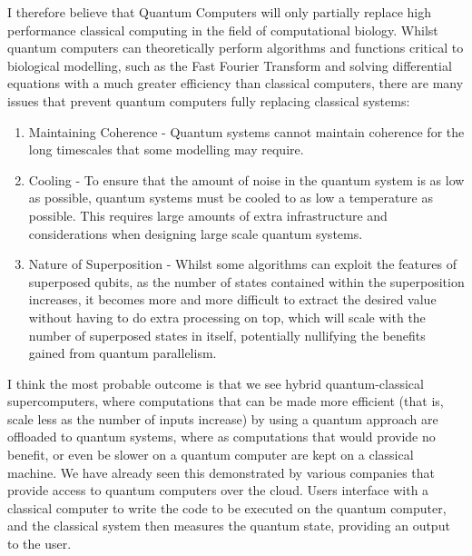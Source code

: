 \noindent
I therefore believe that Quantum Computers will only partially replace high performance classical computing in the field of computational biology. Whilst quantum computers can theoretically perform algorithms and functions critical to biological modelling, such as the Fast Fourier Transform and solving differential equations with a much greater efficiency than classical computers, there are many issues that prevent quantum computers fully replacing classical systems:

\begin{enumerate}
	\item Maintaining Coherence - Quantum systems cannot maintain coherence for the long  timescales that some modelling may require.
	\item Cooling - To ensure that the amount of noise in the quantum system is as low as possible, quantum systems must be cooled to as low a temperature as possible. This requires large amounts of extra infrastructure and considerations when designing large scale quantum systems.
	\item Nature of Superposition - Whilst some algorithms can exploit the features of superposed qubits, as the number of states contained within the superposition increases, it becomes more and more difficult to extract the desired value without having to do extra processing on top, which will scale with the number of superposed states in itself, potentially nullifying the benefits gained from quantum parallelism. 
\end{enumerate}


I think the most probable outcome is that we see hybrid quantum-classical supercomputers, where computations that can be made more efficient (that is, scale less as the number of inputs increase) by using a quantum approach are offloaded to quantum systems, where as computations that would provide no benefit, or even be slower on a quantum computer are kept on a classical machine. We have already seen this demonstrated by various companies that provide access to quantum computers over the cloud. Users interface with a classical computer to write the code to be executed on the quantum computer, and the classical system then measures the quantum state, providing an output to the user.  